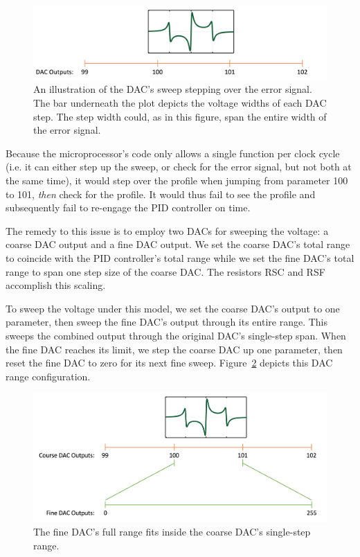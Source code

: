 \documentclass[10pt]{report}
\begin{document}
\begin{figure}[h!]
	\includegraphics[scale=.35]{includes/esig_jumpover}
	\centering
	\caption{An illustration of the DAC's sweep stepping over the error signal. The bar underneath the plot depicts the voltage widths of each DAC step. The step width could, as in this figure, span the entire width of the error signal.}
	\label{fig:esig_jumpover}
\end{figure}

Because the microprocessor's code only allows a single function per clock cycle (i.e. it can either step up the sweep, or check for the error signal, but not both at the same time), it would step over the profile when jumping from parameter 100 to 101, \textit{then} check for the profile. It would thus fail to see the profile and subsequently fail to re-engage the PID controller on time.

The remedy to this issue is to employ two DACs for sweeping the voltage: a coarse DAC output and a fine DAC output. We set the coarse DAC's total range to coincide with the PID controller's total range while we set the fine DAC's total range to span one step size of the coarse DAC. The resistors RSC and RSF accomplish this scaling.

To sweep the voltage under this model, we set the coarse DAC's output to one parameter, then sweep the fine DAC's output through its entire range. This sweeps the combined output through the original DAC's single-step span. When the fine DAC reaches its limit, we step the coarse DAC up one parameter, then reset the fine DAC to zero for its next fine sweep. Figure~\ref{fig:esig_njumpover} depicts this DAC range configuration.

\begin{figure}[h!]
	\includegraphics[scale=.35]{includes/esig_njumpover}
	\centering
	\caption{The fine DAC's full range fits inside the coarse DAC's single-step range.}
	\label{fig:esig_njumpover}
\end{figure}
\end{document}
